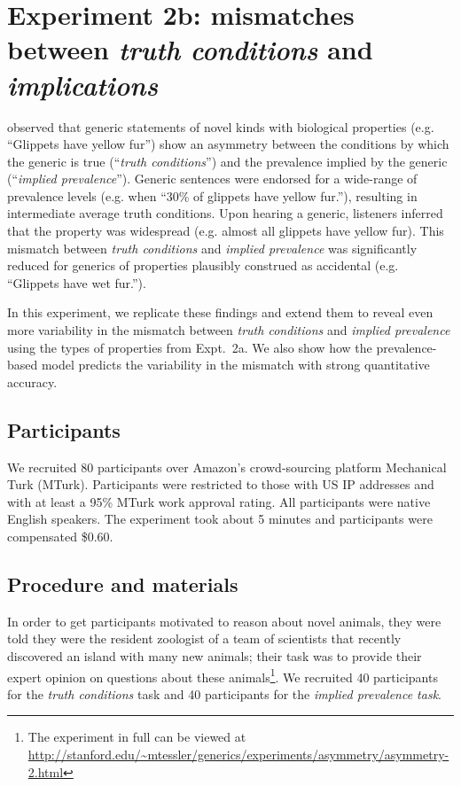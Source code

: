 \documentclass[10pt,letterpaper]{article}
\begin{document}
\section{Experiment 2b: mismatches between \emph{truth conditions} and \emph{implications}}

\citeauthor{Cimpian2010} observed that generic statements of novel kinds with biological properties (e.g. ``Glippets have yellow fur'') show an asymmetry between the conditions by which the generic is true (``\emph{truth conditions}'') and the prevalence implied by the generic (``\emph{implied prevalence}''). 
Generic sentences were endorsed for a wide-range of prevalence levels (e.g. when ``30\% of glippets have yellow fur.''), resulting in intermediate average truth conditions. 
Upon hearing a generic, listeners inferred that the property was widespread (e.g. almost all glippets have yellow fur).
This mismatch between \emph{truth conditions} and \emph{implied prevalence} was significantly reduced for generics of properties plausibly construed as accidental (e.g. ``Glippets have wet fur.'').

In this experiment,  we replicate these findings and extend them to reveal even more variability in the mismatch between \emph{truth conditions} and \emph{implied prevalence} using the types of properties from Expt.~2a.
We also show how the prevalence-based model predicts the variability in the mismatch with strong quantitative accuracy.


\subsection{Participants}

We recruited 80 participants over Amazon's crowd-sourcing platform Mechanical Turk (MTurk).  
Participants were restricted to those with US IP addresses and with at least a 95\% MTurk work approval rating. 
All participants were native English speakers. 
The experiment took about 5 minutes and participants were compensated \$0.60.

\subsection{Procedure and materials}

In order to get participants motivated to reason about novel animals, they were told they were the resident zoologist of a team of scientists that recently discovered an island with many new animals; their task was to provide their expert opinion on questions about these animals\footnote{The experiment in full can be viewed at \url{http://stanford.edu/~mtessler/generics/experiments/asymmetry/asymmetry-2.html}}. 
We recruited 40 participants for the \emph{truth conditions} task and 40 participants for the \emph{implied prevalence task}. 
\end{document}
